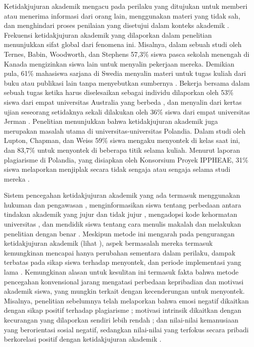 Ketidakjujuran akademik mengacu pada perilaku yang ditujukan untuk memberi atau menerima informasi dari orang lain, menggunakan materi yang tidak sah, dan menghindari proses penilaian yang disetujui dalam konteks akademik \citep{faucher2009academic}. Frekuensi ketidakjujuran akademik yang dilaporkan dalam penelitian menunjukkan sifat global dari fenomena ini. Misalnya, dalam sebuah studi oleh Ternes, Babin, Woodworth, dan Stephens \citep{ternes2019academic} 57,3\% siswa pasca sekolah menengah di Kanada mengizinkan siswa lain untuk menyalin pekerjaan mereka. Demikian pula, 61\% mahasiswa sarjana di Swedia menyalin materi untuk tugas kuliah dari buku atau publikasi lain tanpa menyebutkan sumbernya \citep{trost2009psst}. Bekerja bersama dalam sebuah tugas ketika harus diselesaikan sebagai individu dilaporkan oleh 53\% siswa dari empat universitas Australia yang berbeda \citep{brimble2005perceptions}, dan menyalin dari kertas ujian seseorang setidaknya sekali dilakukan oleh 36\% siswa dari empat universitas Jerman \citep{patrzek2015investigating}. Penelitian menunjukkan bahwa ketidakjujuran akademik juga merupakan masalah utama di universitas-universitas Polandia. Dalam studi oleh Lupton, Chapman, dan Weiss \citep{lupton2000international} 59\% siswa mengaku menyontek di kelas saat ini, dan 83,7\% untuk menyontek di beberapa titik selama kuliah. Menurut laporan plagiarisme di Polandia, yang disiapkan oleh Konsorsium Proyek IPPHEAE, 31\% siswa melaporkan menjiplak secara tidak sengaja atau sengaja selama studi mereka \citep{glendinning2015plagiarism}. 

Sistem pencegahan ketidakjujuran akademik yang ada termasuk menggunakan hukuman dan pengawasan \citep{davis1992academic}, menginformasikan siswa tentang perbedaan antara tindakan akademik yang jujur dan tidak jujur \citep{belter2009strategy}, mengadopsi kode kehormatan universitas \citep{mccabe2004ten}, dan mendidik siswa tentang cara menulis makalah dan melakukan penelitian dengan benar \citep{owens20135}. Meskipun metode ini mengarah pada pengurangan ketidakjujuran akademik (lihat \citep{cronan2017changing}), aspek bermasalah mereka termasuk kemungkinan mencapai hanya perubahan sementara dalam perilaku, dampak terbatas pada sikap siswa terhadap menyontek, dan periode implementasi yang lama \citep{crown1998learning} \citep{roig2006attitudes}. Kemungkinan alasan untuk kesulitan ini termasuk fakta bahwa metode pencegahan konvensional jarang mengatasi perbedaan kepribadian dan motivasi akademik siswa, yang mungkin terkait dengan kecenderungan untuk menyontek. Misalnya, penelitian sebelumnya telah melaporkan bahwa emosi negatif dikaitkan dengan sikap positif terhadap plagiarisme \citep{tindall2020negative}; motivasi intrinsik dikaitkan dengan kecurangan yang dilaporkan sendiri lebih rendah \citep{rettinger2004evaluating}; dan nilai-nilai kemanusiaan yang berorientasi sosial negatif, sedangkan nilai-nilai yang terfokus secara pribadi berkorelasi positif dengan ketidakjujuran akademik \citep{koscielniak2019role}.

